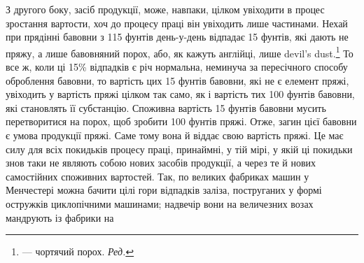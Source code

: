 З другого боку, засіб продукції, може, навпаки, цілком увіходити
в процес зростання вартости, хоч до процесу праці він
увіходить лише частинами. Нехай при прядінні бавовни з 115 фунтів
день-у-день відпадає 15 фунтів, які дають не пряжу,
а лише бавовняний порох, або, як кажуть англійці, лише devil’s
dust.\footnote*{
— чортячий порох. \emph{Ред.}
} То все ж, коли ці 15\% відпадків є річ нормальна, неминуча
за пересічного способу оброблення бавовни, то вартість цих
15 фунтів бавовни, які не є елемент пряжі, увіходить у вартість
пряжі цілком так само, як і вартість тих 100 фунтів бавовни,
які становлять її субстанцію. Споживна вартість 15 фунтів бавовни
мусить перетворитися на порох, щоб зробити 100 фунтів
пряжі. Отже, загин цієї бавовни є умова продукції пряжі. Саме
тому вона й віддає свою вартість пряжі. Це має силу для всіх
покидьків процесу праці, принаймні, у тій мірі, у якій ці покидьки
знов таки не являють собою нових засобів продукції, а через
те й нових самостійних споживних вартостей. Так, по великих
фабриках машин у Менчестері можна бачити цілі гори відпадків
заліза, поструганих у формі остружків циклопічними машинами;
надвечір вони на величезних возах мандрують із фабрики на
\parbreak{}  %
